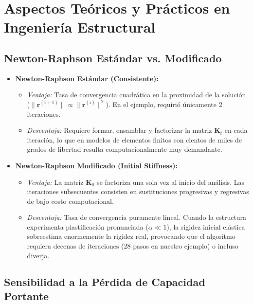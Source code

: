\documentclass[11pt,letterpaper]{article}
\begin{document}
\section{Aspectos Teóricos y Prácticos en Ingeniería Estructural}

\subsection{Newton-Raphson Estándar vs. Modificado}

\begin{itemize}
    \item \textbf{Newton-Raphson Estándar (Consistente):}
    \begin{itemize}
        \item \textit{Ventaja:} Tasa de convergencia cuadrática en la proximidad de la solución ($\|\mathbf{r}^{(i+1)}\| \propto \|\mathbf{r}^{(i)}\|^2$). En el ejemplo, requirió únicamente 2 iteraciones.
        \item \textit{Desventaja:} Requiere formar, ensamblar y factorizar la matriz $\mathbf{K}_t$ en cada iteración, lo que en modelos de elementos finitos con cientos de miles de grados de libertad resulta computacionalmente muy demandante.
    \end{itemize}

    \item \textbf{Newton-Raphson Modificado (Initial Stiffness):}
    \begin{itemize}
        \item \textit{Ventaja:} La matriz $\mathbf{K}_0$ se factoriza una sola vez al inicio del análisis. Las iteraciones subsecuentes consisten en sustituciones progresivas y regresivas de bajo costo computacional.
        \item \textit{Desventaja:} Tasa de convergencia puramente lineal. Cuando la estructura experimenta plastificación pronunciada ($\alpha \ll 1$), la rigidez inicial elástica sobreestima enormemente la rigidez real, provocando que el algoritmo requiera decenas de iteraciones (28 pasos en nuestro ejemplo) o incluso diverja.
    \end{itemize}
\end{itemize}

\subsection{Sensibilidad a la Pérdida de Capacidad Portante}
\end{document}
